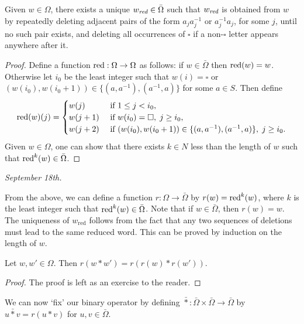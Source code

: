 \begin{lemma}
    Given $w \in \Omega$, there exists a unique $w_{\emph{\text{red}}} \in \bar{\Omega}$ such that $w_{\emph{\text{red}}}$ is obtained from $w$ by repeatedly deleting adjacent pairs of the form $a_{j}a_{j}^{-1}$ or $a_{j}^{-1}a_{j}$, for some $j$, until no such pair exists, and deleting all occurrences of $\square$ if a non-$\square$ letter appears anywhere after it.
\end{lemma}

\begin{proof}
    Define a function $\operatorname{red}:\Omega \to \Omega$ as follows: if $w \in \bar{\Omega}$ then $\operatorname{red}(w) = w$. Otherwise let $i_{0}$ be the least integer such that $w(i) = \square$ or $(w(i_{0}),w(i_{0}+1)) \in \{(a,a^{-1}),(a^{-1},a)\}$ for some $a \in S$. Then define
    \begin{align}
        \operatorname{red}(w)(j) = \begin{cases}
            w(j) &\text{ if } 1 \leq j < i_{0},\\
            w(j+1) &\text{ if } w(i_{0}) = \square,\; j \geq i_{0},\\
            w(j+2) &\text{ if } (w(i_{0}),w(i_{0}+1)) \in \{(a,a^{-1}),(a^{-1},a)\},\; j \geq i_{0}.
        \end{cases}
    \end{align}
    Given $w \in \Omega$, one can show that there exists $k \in N$ less than the length of $w$ such that $\operatorname{red}^{k}(w) \in \bar{\Omega}$.
\end{proof}

\textit{September 18th.}

From the above, we can define a function $r:\Omega \to \bar{\Omega}$ by $r(w) = \operatorname{red}^{k}(w)$, where $k$ is the least integer such that $\operatorname{red}^{k}(w) \in \bar{\Omega}$. Note that if $w \in \bar{\Omega}$, then $r(w) = w$. The uniqueness of $w_{\text{red}}$ follows from the fact that any two sequences of deletions must lead to the same reduced word. This can be proved by induction on the length of $w$.


\begin{proposition}
    Let $w,w' \in \Omega$. Then $r(w \ast w') = r(r(w) \ast r(w'))$.
\end{proposition}
\begin{proof}
    The proof is left as an exercise to the reader.
\end{proof}

We can now `fix' our binary operator by defining $\bar{\ast}:\bar{\Omega}\times\bar{\Omega} \to \bar{\Omega}$ by $u \bar{\ast} v = r(u \ast v)$ for $u,v \in \bar{\Omega}$.

